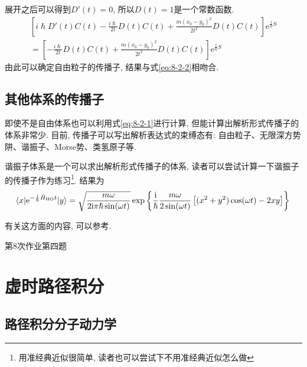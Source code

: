         展开之后可以得到$D'(t) = 0$, 所以$D(t)=1$是一个常数函数. 
        \begin{equation}\begin{aligned}
            \left[i\hslash D'(t) C(t) - \frac{i\hslash}{2t} D(t) C(t) + \frac{m(x_0-y_0)^2}{2t^2} D(t) C(t) \right] \mathrm{e}^{\frac {\mathrm{i}}{\hslash} S} \\
            = \left[- \frac{i\hslash}{2t} D(t) C(t) + \frac{m(x_0-y_0)^2}{2t^2} D(t) C(t)\right] \mathrm{e}^{\frac {\mathrm{i}}{\hslash} S}
        \end{aligned}\end{equation}
        由此可以确定自由粒子的传播子, 结果与式\ref{eq:8-2-2}相吻合. 

        \subsection{其他体系的传播子}

        即使不是自由体系也可以利用式\ref{eq:8-2-1}进行计算, 但能计算出解析形式传播子的体系非常少. 目前, 传播子可以写出解析表达式的束缚态有: 自由粒子、无限深方势阱、谐振子、Morse势、类氢原子等\cite{Grosche_HFPI}\cite{Kleinnert_PIQMSPP}. 

        谐振子体系是一个可以求出解析形式传播子的体系, 读者可以尝试计算一下谐振子的传播子作为练习\footnote{用准经典近似很简单, 读者也可以尝试下不用准经典近似怎么做}. 结果为
        \begin{equation}
            \langle x | \mathrm{e}^{-\frac {\mathrm{i}}{\hslash}\hat{H}_\mathrm{HO}t} | y \rangle = \sqrt{\frac{m\omega}{2\mathrm{i}\pi\hslash\sin(\omega t)}} \exp\left\{ \frac{\mathrm{i}}{\hslash} \frac{m\omega}{2\sin(\omega t)}\left[ (x^2 + y^2)\cos(\omega t) - 2xy \right] \right\} \\
        \end{equation}

        有关这方面的内容, 可以参考\cite{费曼量子力学与路径积分}\cite{谷村吉隆化学物理入门}.

        \begin{asg}
            第8次作业第四题
        \end{asg}

    \section{虚时路径积分}

        \subsection{路径积分分子动力学}

